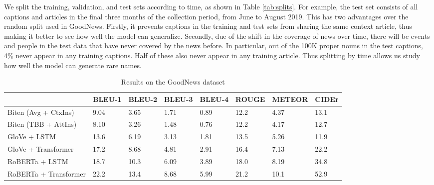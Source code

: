 \documentclass[10pt,twocolumn,letterpaper]{article}
\begin{document}
We split the training, validation, and test sets according to time, as shown in
Table \ref{tab:splits}. For example, the test set consists of all captions and
articles in the final three months of the collection period, from June to
August 2019. This has two advantages over the random split used in GoodNews.
Firstly, it prevents captions in the training and test sets from sharing the
same context article, thus making it better to see how well the model can
generalize. Secondly, due of the shift in the coverage of news over time, there
will be events and people in the test data that have never covered by the news
before. In particular, out of the 100K proper nouns in the test captions, 4\%
never appear in any training captions. Half of these also never appear in any
training article. Thus splitting by time allows us study how well the model can
generate rare names.



\begin{table*}[t]
	\caption {Results on the GoodNews dataset}
	\label{tab:results-goodnews}
	\centering
	\begin{tabular}{llllllll}
		\toprule
		 & BLEU-1  & BLEU-2 & BLEU-3 & BLEU-4 & ROUGE & METEOR & CIDEr\\
      \midrule
      Biten (Avg + CtxIns) \cite{Biten2019GoodNews} & 9.04 & 3.65 & 1.71 & 0.89 & 12.2 & 4.37 & 13.1 \\
      Biten (TBB + AttIns) \cite{Biten2019GoodNews} & 8.10 & 3.26 & 1.48 & 0.76 & 12.2 & 4.17 & 12.7 \\
      \midrule
      GloVe + LSTM & 13.6 & 6.19 & 3.13 & 1.81 & 13.5 & 5.26 & 11.9 \\
      GloVe + Transformer & 17.2 & 8.68 & 4.81 & 2.91 & 16.4 & 7.13 & 22.2 \\
      RoBERTa + LSTM & 18.7  & 10.3 & 6.09 & 3.89  & 18.0  & 8.19 & 34.8  \\
      RoBERTa + Transformer & 22.2 & 13.4 & 8.68 & 5.99 & 21.2 & 10.1 & 52.9 \\ %
		\bottomrule
	\end{tabular}
\end{table*}
\end{document}
